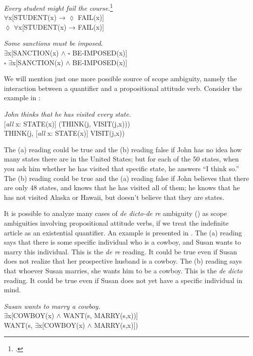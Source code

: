 \ea \label{ex:14.37}
\textit{Every student might fail the course}.\footnote{\citet[48]{Abbott2010}.}\\
\ex ${\forall}$x[STUDENT(x) → ${\lozenge}$ FAIL(x)]\\
\ex ${\lozenge}$ ${\forall}$x[STUDENT(x) → FAIL(x)]
\z

\ea \label{ex:14.38}
\textit{Some sanctions must be imposed}.\\
\ex ${\exists}$x[SANCTION(x) $\wedge$ ${\square}$ BE-IMPOSED(x)]\\
\ex ${\square}$ ${\exists}$x[SANCTION(x) $\wedge$ BE-IMPOSED(x)]
\z


We will mention just one more possible source of scope ambiguity, namely the interaction between a quantifier and a propositional attitude verb. Consider the example in :


\ea \label{ex:14.39}
\textit{John thinks that he has visited every state.}\\
\ea \label{ex:14.}  [\textit{all} x: STATE(x)] (THINK(j, VISIT(j,x)))\\
\ex  THINK(j, [\textit{all} x: STATE(x)] VISIT(j,x))
                       \z
\z


The (a) reading could be true and the (b) reading false if John has no idea how many states there are in the United States; but for each of the 50 states, when you ask him whether he has visited that specific state, he answers “I think so.” The (b) reading could be true and the (a) reading false if John believes that there are only 48 states, and knows that he has visited all of them; he knows that he has not visited Alaska or Hawaii, but doesn’t believe that they are states.



It is possible to analyze many cases of \textit{de dicto-de re} ambiguity () as scope ambiguities involving propositional attitude verbs, if we treat the indefinite article as an existential quantifier. An example is presented in . The (a) reading says that there is some specific individual who is a cowboy, and Susan wants to marry this individual. This is the \textit{de re} reading. It could be true even if Susan does not realize that her prospective husband is a cowboy. The (b) reading says that whoever Susan marries, she wants him to be a cowboy. This is the \textit{de dicto} reading. It could be true even if Susan does not yet have a specific individual in mind.


\ea \label{ex:14.40}
\textit{Susan wants to marry a cowboy.}\\
\ea  ${\exists}$x[COWBOY(x) $\wedge$ WANT(s, MARRY(s,x))]\\
\ex  WANT(s, ${\exists}$x[COWBOY(x) $\wedge$ MARRY(s,x)])
                       \z
\z


